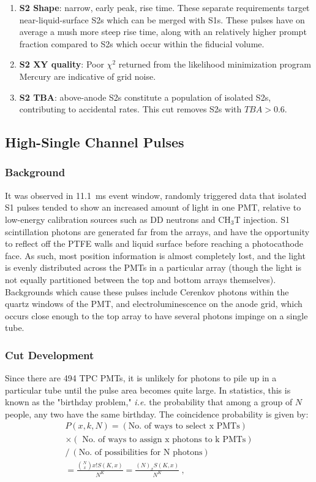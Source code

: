 \begin{enumerate}
    \item \textbf{S2 Shape}: narrow, early peak, rise time.
    These separate requirements target near-liquid-surface S2s which can be merged with S1s. 
    These pulses have on average a mush more steep rise time, along with an relatively higher prompt fraction compared to S2s which occur within the fiducial volume.
    \item \textbf{S2 XY quality}: Poor $\chi^2$ returned from the likelihood minimization program Mercury\cite{lux_collaboration_position_2018} are indicative of grid noise. 
    \item \textbf{S2 TBA}: above-anode S2s constitute a population of isolated S2s, contributing to accidental rates.
    This cut removes S2s with $TBA > 0.6$.
\end{enumerate}

\afterpage{\FloatBarrier}
\subsection {High-Single Channel Pulses}
\subsubsection{Background}
It was observed in 11.1~ms event window, randomly triggered data that isolated S1 pulses tended to show an increased amount of light in one PMT, relative to low-energy calibration sources such as DD neutrons and CH$_3$T injection.
S1 scintillation photons are generated far from the arrays, and have the opportunity to reflect off the PTFE walls and liquid surface before reaching a photocathode face.
As such, most position information is almost completely lost, and the light is evenly distributed across the PMTs in a particular array (though the light is not equally partitioned between the top and bottom arrays themselves).
Backgrounds which cause these pulses include Cerenkov photons within the quartz windows of the PMT, and electroluminescence on the anode grid, which occurs close enough to the top array to 
have several photons impinge on a single tube.

\subsubsection{Cut Development}

Since there are 494 TPC PMTs, it is unlikely for photons to pile up in a particular tube until the pulse area becomes quite large.
In statistics, this is known as the "birthday problem," \textit{i.e.} the probability that among a group of $N$ people, any two have the same birthday.
The coincidence probability is given by\cite{williamson_revisiting_2009}:
\begin{align}
    P(x,k,N) = (\text{No. of ways to select x PMTs})  \nonumber \\
    \times(\text{ No. of ways to assign x photons to k PMTs})  \nonumber\\ 
    /\ (\text{No. of possibilities for N photons})  \nonumber\\
    = \frac{\genfrac(){0pt}{}{N}{ x} x! S(K,x) }{ N^K} = \frac{(N)_x S(K,x) }{ N^K}~,
\end{align}


